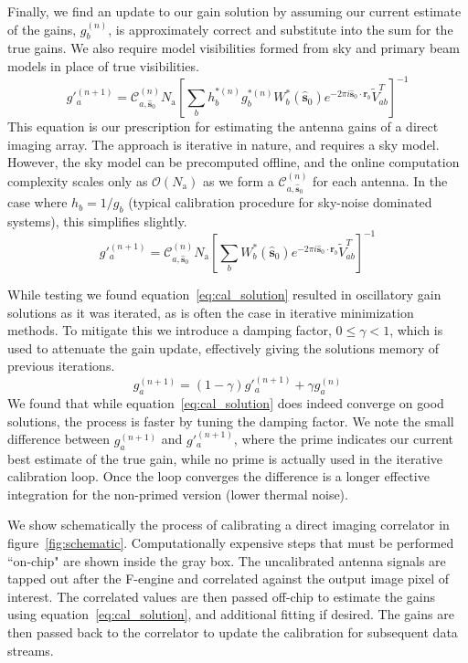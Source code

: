 \documentclass[a4paper,fleqn,usenatbib]{../mnras}
\newcommand{\Nant}{\ensuremath{N_{\mathrm{a}}}}
\newcommand{\spix}{\ensuremath{\hat{\mathbf{s}}_{0}}}
\newcommand{\Cna}[1][n]{\ensuremath{\mathcal{C}^{(#1)}_{a,\spix}}}
\newcommand{\rb}{\ensuremath{\mathbf{r}_b}}
\newcommand{\beamtheta}{\ensuremath{W}}
\newcommand{\V}{\ensuremath{\widetilde{V}}}
\newcommand{\damp}{\ensuremath{\gamma}}
\begin{document}
Finally, we find an update to our gain solution by assuming our current estimate of the gains, $g^{(n)}_b$, is approximately correct and substitute into the sum for the true gains. We also require model visibilities formed from sky and primary beam models in place of true visibilities.
\begin{equation}\label{eq:cal_solution}
g'^{(n+1)}_a = \Cna \Nant \left[ \sum_b h^{*(n)}_b g^{*(n)}_b \beamtheta^*_b(\spix) e^{-2\pi i \spix \cdot \rb} \V^T_{ab} \right]^{-1}
\end{equation}
This equation is our prescription for estimating the antenna gains of a direct imaging array. The approach is iterative in nature, and requires a sky model. However, the sky model can be precomputed offline, and the online computation complexity scales only as $\mathcal{O}(\Nant)$ as we form a $\Cna$ for each antenna. In the case where $h_b = 1/g_b$ (typical calibration procedure for sky-noise dominated systems), this simplifies slightly.
\begin{equation}\label{eq:cal_solution_simple}
g'^{(n+1)}_a = \Cna \Nant \left[ \sum_b \beamtheta^*_b(\spix) e^{-2\pi i \spix \cdot \rb} \V^T_{ab} \right]^{-1}
\end{equation}

While testing we found equation~\ref{eq:cal_solution} resulted in oscillatory gain solutions as it was iterated, as is often the case in iterative minimization methods. To mitigate this we introduce a damping factor, $0 \leq \damp <1$, which is used to attenuate the gain update, effectively giving the solutions memory of previous iterations.
\begin{equation}
g^{(n+1)}_a = (1-\damp) g'^{(n+1)}_a + \damp g^{(n)}_a
\end{equation}
We found that while equation~\ref{eq:cal_solution} does indeed converge on good solutions, the process is faster by tuning the damping factor. We note the small difference between $g^{(n+1)}_a$ and $g'^{(n+1)}_a$, where the prime indicates our current best estimate of the true gain, while no prime is actually used in the iterative calibration loop. Once the loop converges the difference is a longer effective integration for the non-primed version (lower thermal noise). 

We show schematically the process of calibrating a direct imaging correlator in figure~\ref{fig:schematic}. Computationally expensive steps that must be performed ``on-chip" are shown inside the gray box. The uncalibrated antenna signals are tapped out after the F-engine and correlated against the output image pixel of interest. The correlated values are then passed off-chip to estimate the gains using equation~\ref{eq:cal_solution}, and additional fitting if desired. The gains are then passed back to the correlator to update the calibration for subsequent data streams. 
\end{document}
